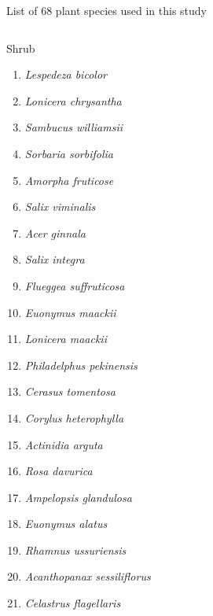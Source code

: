 \begin{frame}[shrink]{List of 68 plant species used in this study}
\begin{columns}[T,onlytextwidth]
	\begin{alertblock}{Shrub}
		\begin{enumerate}			
			\item \emph{Lespedeza bicolor} \item \emph{Lonicera chrysantha} \item \emph{Sambucus williamsii}
			\item \emph{Sorbaria sorbifolia} \item \emph{Amorpha fruticose} \item \emph{Salix viminalis}
			\item \emph{Acer ginnala} \item \emph{Salix integra} \item \emph{Flueggea suffruticosa}
			\item \emph{Euonymus maackii}
			\item \emph{Lonicera maackii}	\item \emph{Philadelphus pekinensis} \item \emph{Cerasus tomentosa}
			\item \emph{Corylus heterophylla}	\item \emph{Actinidia arguta} \item \emph{Rosa davurica}
			\item \emph{Ampelopsis glandulosa}	\item \emph{Euonymus alatus} \item \emph{Rhamnus ussuriensis}
			\item \emph{Acanthopanax sessiliflorus}	\item \emph{Celastrus flagellaris}		
		\end{enumerate}	
	\end{alertblock}
	

\end{columns}
\end{frame}
